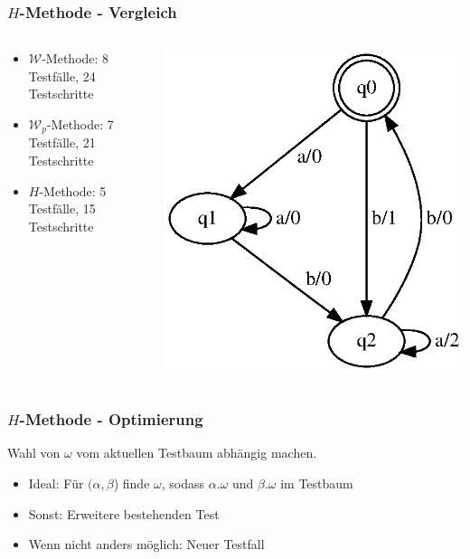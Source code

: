 \documentclass[10pt]{beamer}
\newcommand{\W}{\mathcal{W}}
\begin{document}
\begin{frame}
\frametitle{$H$-Methode - Vergleich}
\begin{columns}[T] %

\begin{column}{.7\textwidth}
\begin{itemize}[<+->]
    \item $\W$-Methode: 8 Testfälle, 24 Testschritte
    \item $\W_p$-Methode: 7 Testfälle, 21 Testschritte
    \item $H$-Methode: 5 Testfälle, 15 Testschritte
\end{itemize}
\end{column}%

\begin{column}{.50\textwidth}
\centering
\includegraphics[width=\textwidth]{images/fsm-example01_orig}%
\end{column}%

\end{columns}
\end{frame}

\begin{frame}
\frametitle{$H$-Methode - Optimierung}
Wahl von $\omega$ vom aktuellen Testbaum abhängig machen.

\begin{itemize}
      \item<2-> Ideal: Für $(\alpha, \beta$) finde $\omega$, sodass $\alpha.\omega$ und $\beta.\omega$ im Testbaum
      \item<3-> Sonst: Erweitere bestehenden Test
      \item<4-> Wenn nicht anders möglich: Neuer Testfall 
    \end{itemize}
\end{frame}
\end{document}

